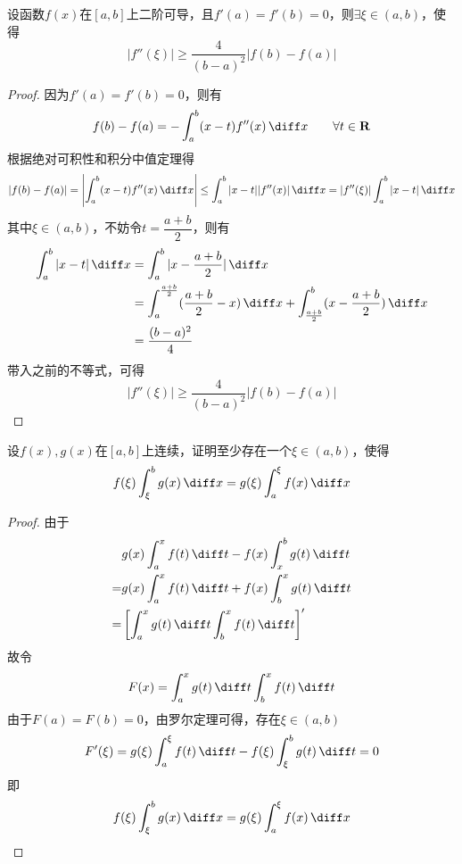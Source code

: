 \begin{example}
    设函数$f(x)$在$[a,b]$上二阶可导，且$f'(a)=f'(b)=0$，则$\exists\xi\in(a,b)$，使得
    \[ |f''(\xi)| \geq \frac{4}{(b-a)^2}|f(b)-f(a)| \]
\end{example}
\begin{proof}
    因为$f'(a)=f'(b)=0$，则有
    \[ f(b)-f(a) = -\int_a^b(x-t)f''(x)\,\diff x \qquad \forall t \in \mathbf{R}\]
    根据绝对可积性和积分中值定理得
    \[
        |f(b)-f(a)|  = \left| \int_a^b(x-t)f''(x)\,\diff x \right| \leq \int_a^b|x-t||f''(x)|\,\diff x = |f''(\xi)|\int_a^b|x-t|\,\diff x
    \]
    其中$\xi\in(a,b)$，不妨令$t=\dfrac{a+b}{2}$，则有
    \begin{align*}
        \int_a^b|x-t|\,\diff x
         & = \int_a^b |x-\frac{a+b}{2}|\,\diff x                                                                 \\
         & = \int_a^{\frac{a+b}{2}}(\frac{a+b}{2}-x)\,\diff x + \int_{\frac{a+b}{2}}^b(x-\frac{a+b}{2})\,\diff x \\
         & = \frac{(b-a)^2}{4}
    \end{align*}
    带入之前的不等式，可得
    \[ |f''(\xi)| \geq \frac{4}{(b-a)^2}|f(b)-f(a)| \]
\end{proof}

\begin{example}
    设$f(x),g(x)$在$[a,b]$上连续，证明至少存在一个$\xi\in(a,b)$，使得
    \[ f(\xi)\int_\xi^b g(x)\,\diff x = g(\xi)\int_a^\xi f(x)\,\diff x \]
\end{example}
\begin{proof}
    由于
    \begin{align*}
          & g(x)\int_a^x f(t)\,\diff t - f(x)\int_x^b g(t)\,\diff t   \\
        = & g(x)\int_a^x f(t)\,\diff t + f(x)\int_b^x g(t)\,\diff t   \\
        = & \left[\int_a^xg(t)\,\diff t \int_b^xf(t)\,\diff t\right]'
    \end{align*}
    故令
    \[ F(x) = \int_a^xg(t)\,\diff t \int_b^xf(t)\,\diff t \]
    由于$F(a)=F(b)=0$，由罗尔定理可得，存在$\xi\in(a,b)$
    \[ F'(\xi) = g(\xi)\int_a^\xi f(t)\,\diff t - f(\xi)\int_\xi^b g(t)\,\diff t = 0 \]
    即
    \[ f(\xi)\int_\xi^b g(x)\,\diff x = g(\xi)\int_a^\xi f(x)\,\diff x \]
\end{proof}

